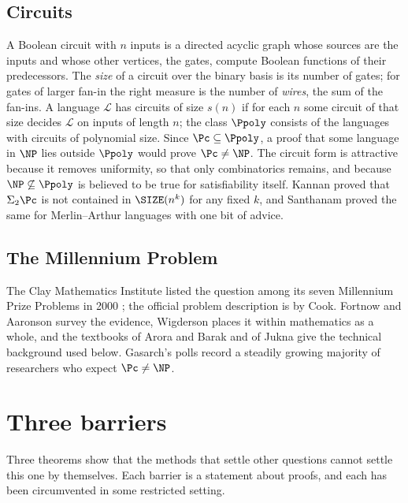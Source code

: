 \subsection{Circuits}
A Boolean circuit with $n$ inputs is a directed acyclic graph whose sources are
the inputs and whose other vertices, the gates, compute Boolean functions of
their predecessors. The \emph{size} of a circuit over the binary basis is its
number of gates; for gates of larger fan-in the right measure is the number of
\emph{wires}, the sum of the fan-ins. A language $\mathcal L$ has circuits of
size $s(n)$ if for each $n$ some circuit of that size decides $\mathcal L$ on
inputs of length $n$; the class $\Ppoly$ consists of the languages with
circuits of polynomial size. Since $\Pc\subseteq\Ppoly$, a proof that some
language in $\NP$ lies outside $\Ppoly$ would prove $\Pc\ne\NP$. The circuit
form is attractive because it removes uniformity, so that only combinatorics
remains, and because $\NP\not\subseteq\Ppoly$ is believed to be true for
satisfiability itself. Kannan \cite{Kan82} proved that $\Sigma_2\Pc$ is not
contained in $\SIZE(n^k)$ for any fixed $k$, and Santhanam \cite{San09}
proved the same for Merlin--Arthur languages with one bit of advice.

\subsection{The Millennium Problem}
The Clay Mathematics Institute listed the question among its seven Millennium
Prize Problems in 2000 \cite{Clay}; the official problem description is by
Cook. Fortnow \cite{For09} and Aaronson \cite{Aar16} survey the evidence,
Wigderson \cite{Wig19} places it within mathematics as a whole, and the
textbooks of Arora and Barak \cite{AB09} and of Jukna \cite{Juk12} give the
technical background used below. Gasarch's polls \cite{Gas19} record a
steadily growing majority of researchers who expect $\Pc\ne\NP$.

\section{Three barriers}\label{sec:barriers}

Three theorems show that the methods that settle other questions cannot settle
this one by themselves. Each barrier is a statement about proofs, and each has
been circumvented in some restricted setting.

